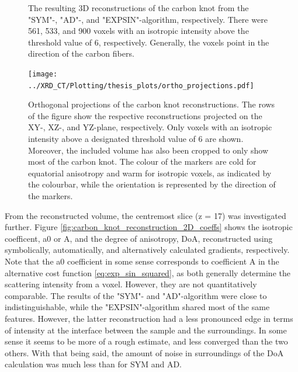 \begin{figure}[h!]
    

    \caption[3D Reconstructions of Carbon Knot]{ The resulting 3D reconstructions of the carbon knot from the "SYM"-, "AD"-, and "EXPSIN"-algorithm, respectively.
        There were 561, 533, and 900 voxels with an isotropic intensity above the threshold value of 6, respectively. Generally, the voxels point in the direction of the carbon fibers.
    }
    \label{fig:carbon_knot_reconstruction_3D}
\end{figure}

\clearpage

\begin{figure}

    \centering

    \texttt{[image: ../XRD\_CT/Plotting/thesis\_plots/ortho\_projections.pdf]}
    
    \caption[Orthogonal Projections of Carbon Knot]{ Orthogonal projections of the carbon knot reconstructions.
        The rows of the figure show the respective reconstructions projected on the XY-, XZ-, and YZ-plane, respectively.
        Only voxels with an isotropic intensity above a designated threshold value of 6 are shown.
        Moreover, the included volume has also been cropped to only show most of the carbon knot.
        The colour of the markers are cold for equatorial anisotropy and warm for isotropic voxels, as indicated by the colourbar, while the orientation is represented by the direction of the markers.
    }
    \label{fig:carbon_knot_ortho}

\end{figure}

\clearpage

From the reconstructed volume, the centremost slice (z = 17) was investigated further.
Figure \ref{fig:carbon_knot_reconstruction_2D_coeffs} shows the isotropic coefficent, a0 or A, and the degree of anisotropy, DoA, reconstructed using symbolically, automatically, and alternatively calculated gradients, respectively.
Note that the a0 coefficient in some sense corresponds to coefficient A in the alternative cost function \eqref{eq:exp_sin_squared}, as both generally determine the scattering intensity from a voxel.
However, they are not quantitatively comparable.
The results of the "SYM"- and "AD"-algorithm were close to indistinguishable,
while the "EXPSIN"-algorithm shared most of the same features.
However, the latter reconstruction had a less pronounced edge in terms of intensity at the interface between the sample and the surroundings.
In some sense it seems to be more of a rough estimate, and less converged than the two others.
With that being said, the amount of noise in surroundings of the DoA calculation was much less than for SYM and AD.

